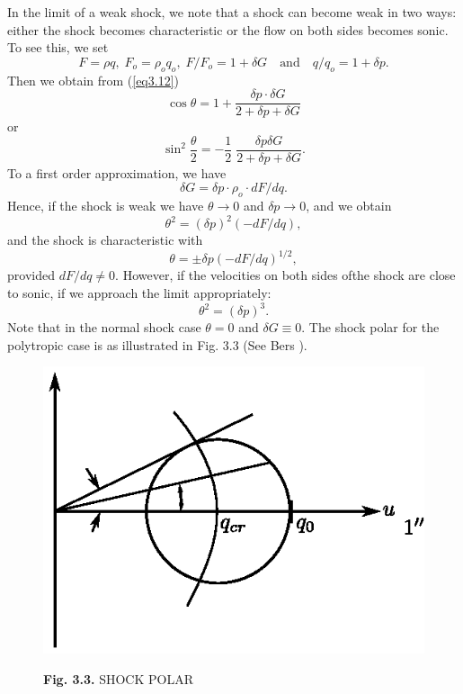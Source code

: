 In the limit of a weak shock, we note that a shock can become weak in two ways: either the shock becomes characteristic or the flow on both sides becomes sonic.
To see this, we set
$$
F = \rho q, \; F_o = \rho_o q_o, \; F/F_o = 1 + \delta G \quad \text{and} \quad q/ q_o = 1 + \delta p.
$$
Then we obtain from (\ref{eq3.12})
$$
\cos \theta = 1 + \frac{\delta p \cdot \delta G}{2 + \delta p + \delta G}
$$
or 
$$
\sin^2 \frac{\theta}{2} = - \frac{1}{2} \; \frac{\delta p \delta G}{2 + \delta p + \delta G}.
$$
To a first order approximation, we have
$$
\delta G = \delta p \cdot \rho_o \cdot d F / dq .
$$
Hence, if the shock is weak we have $\theta \to 0$ and $\delta p \to 0$, and we obtain
$$
\theta^2 = (\delta p)^2 (-dF / dq),
$$
and the shock is characteristic with 
$$
\theta = \pm \delta p (-d F / dq)^{1/2},
$$
provided $dF/dq \neq 0$. However, if the velocities on both sides of\pageoriginale the shock are close to sonic, if we approach the limit appropriately:
$$
\theta^2 = (\delta p)^3.
$$
Note that in the normal shock case $\theta = 0$ and $\delta G \equiv 0$. The shock polar for the polytropic case is as illustrated in Fig. 3.3 (See Bers \cite{key2}).
\begin{figure}[H]
\centering
\includegraphics{figures/fig3.3.eps}
\centerline{{\bf Fig. 3.3.} SHOCK POLAR}
\end{figure}

